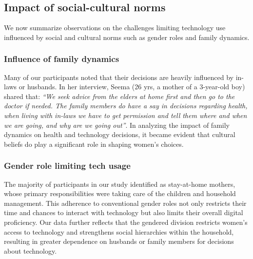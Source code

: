 \subsection{Impact of social-cultural norms}
We now summarize observations on the challenges limiting technology use influenced by social and cultural norms such as gender roles and family dynamics. 

\subsubsection{Influence of family dynamics} 

Many of our participants noted that their decisions are heavily influenced by in-laws or husbands. In her interview, Seema (26 yrs, a mother of a 3-year-old boy) shared that: \textit{``We seek advice from the elders at home first and then go to the doctor if needed. The family members do have a say in decisions regarding health, when living with in-laws we have to get permission and tell them where and when we are going, and why are we going out''}. 
In analyzing the impact of family dynamics on health and technology decisions, it became evident that cultural beliefs do play a significant role in shaping women's choices. 






\subsubsection{Gender role limiting tech usage} 
The majority of participants in our study identified as stay-at-home mothers, whose primary responsibilities were taking care of the children and household management. This adherence to conventional gender roles not only restricts their time and chances to interact with technology but also limits their overall digital proficiency. Our data further reflects that the gendered division restricts women's access to technology and strengthens social hierarchies within the household, resulting in greater dependence on husbands or family members for decisions about technology.

